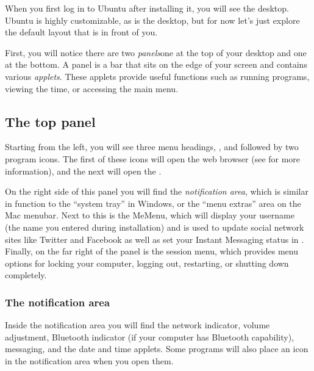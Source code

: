 When you first log in to Ubuntu after installing it, you will see the  desktop. Ubuntu is highly customizable, as is the  desktop, but for now let's just explore the default layout that is in front of you.


First, you will notice there are two \emph{panels}\dash one at the top of your desktop and one at the bottom. A panel is a bar that sits on the edge of your screen and contains various \emph{applets}.  These applets provide useful functions such as running programs, viewing the time, or accessing the main menu.

\subsection{The top panel}
Starting from the left, you will see three menu headings\dash {}, , and \dash followed by two program icons. The first of these icons will open the  web browser (see  for more information), and the next will open the . 

On the right side of this panel you will find the \emph{notification area}, which is similar in function to the ``system tray'' in Windows, or the ``menu extras'' area on the Mac  menubar. Next to this is the \gls{MeMenu}, which will display your username (the name you entered during installation) and is used to update social network sites like Twitter and Facebook as well as set your Instant Messaging status in .  Finally, on the far right of the panel is the session menu, which provides menu options for locking your computer, logging out, restarting, or shutting down completely. 

\subsubsection{The notification area}
Inside the \gls{notification area} you will find the network indicator, volume adjustment, Bluetooth indicator (if your computer has Bluetooth capability), messaging, and the date and time applets. Some
programs will also place an icon in the notification area when you open them.

